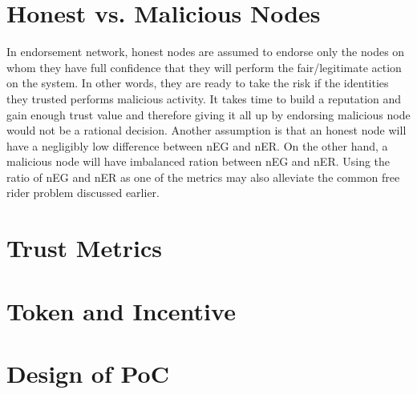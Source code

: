 





\section{Honest vs. Malicious Nodes}
In endorsement network, honest nodes are assumed to endorse only the
nodes on whom they have full confidence that they will perform the
fair/legitimate action on the system. In other words, they are ready
to take the risk if the identities they trusted performs malicious
activity. It takes time to build a reputation and gain enough trust value
and therefore giving it all up by endorsing malicious node would not
be a rational decision. Another assumption is that an honest node will
have a negligibly low difference between nEG and nER. On the other hand,
a malicious node will have imbalanced ration between nEG and nER. Using
the ratio of nEG and nER as one of the metrics may also alleviate the
common free rider problem discussed earlier.

\section{Trust Metrics}
\section{Token and Incentive}

\section{Design of PoC}
